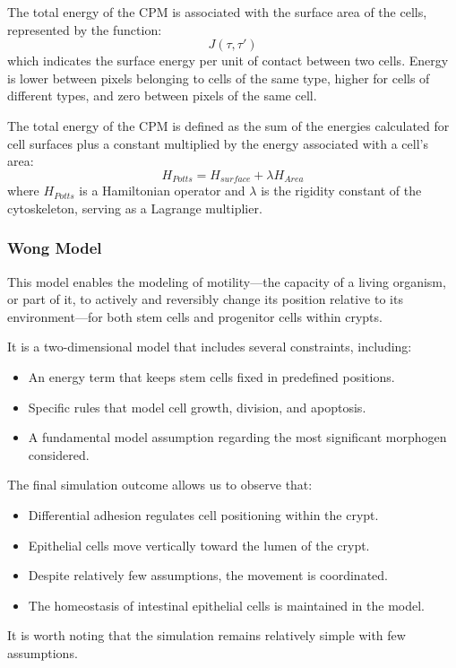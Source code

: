 The total energy of the CPM is associated with the surface area of the cells, represented by the function:
\[
J(\tau, \tau')
\]
which indicates the surface energy per unit of contact between two cells. Energy is lower between pixels belonging to cells of the same type, higher for cells of different types, and zero between pixels of the same cell.

The total energy of the CPM is defined as the sum of the energies calculated for cell surfaces plus a constant multiplied by the energy associated with a cell's area:
\[
H_{Potts} = H_{surface} + \lambda H_{Area}
\]
where \(H_{Potts}\) is a Hamiltonian operator and \(\lambda\) is the rigidity constant of the cytoskeleton, serving as a Lagrange multiplier.

\subsubsection{Wong Model}
This model enables the modeling of motility—the capacity of a living organism, or part of it, to actively and reversibly change its position relative to its environment—for both stem cells and progenitor cells within crypts.

It is a two-dimensional model that includes several constraints, including:
\begin{itemize}
    \item An energy term that keeps stem cells fixed in predefined positions.
    \item Specific rules that model cell growth, division, and apoptosis.
    \item A fundamental model assumption regarding the most significant morphogen considered.
\end{itemize}

The final simulation outcome allows us to observe that:
\begin{itemize}
    \item Differential adhesion regulates cell positioning within the crypt.
    \item Epithelial cells move vertically toward the lumen of the crypt.
    \item Despite relatively few assumptions, the movement is coordinated.
    \item The homeostasis of intestinal epithelial cells is maintained in the model.
\end{itemize}

It is worth noting that the simulation remains relatively simple with few assumptions.

